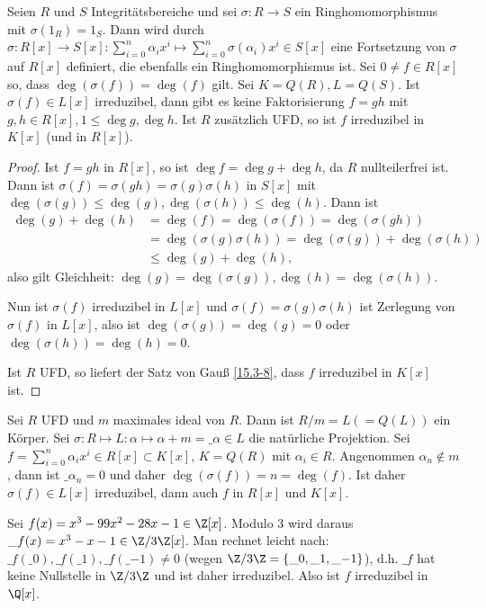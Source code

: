 \begin{st}[Reduktionskriterium] \label{15.3-12}
	Seien $R$ und $S$ Integritätsbereiche und sei $\sigma: R \to S$ ein Ringhomomorphismus mit $\sigma(1_R) = 1_S$.
	Dann wird durch $\sigma: R[x] \to S[x] : \sum_{i=0}^n \alpha_i x^i \mapsto \sum_{i=0}^n \sigma(\alpha_i) x^i \in S[x]$ eine Fortsetzung von $\sigma$ auf $R[x]$ definiert, die ebenfalls ein Ringhomomorphismus ist.
	Sei $0 \neq f \in R[x]$ so, dass $\deg(\sigma(f)) = \deg(f)$ gilt.
	Sei $K = Q(R), L = Q(S)$.
	Ist $\sigma(f) \in L[x]$ irreduzibel, dann gibt es keine Faktorisierung $f = gh$ mit $g, h \in R[x], 1 \le \deg g, \deg h$.
	Ist $R$ zusätzlich UFD, so ist $f$ irreduzibel in $K[x]$ (und in $R[x]$).
	\begin{proof}
		Ist $f = gh$ in $R[x]$, so ist $\deg f = \deg g + \deg h$, da $R$ nullteilerfrei ist.
		Dann ist $\sigma(f) = \sigma(gh) = \sigma(g)\sigma(h)$ in $S[x]$ mit $\deg(\sigma(g)) \le \deg(g), \deg(\sigma(h)) \le \deg(h)$.
		Dann ist
		\begin{align*}
			\deg(g) + \deg(h)
			&= \deg(f)
			= \deg(\sigma(f))
			= \deg(\sigma(gh)) \\
			&= \deg(\sigma(g)\sigma(h))
			= \deg(\sigma(g)) + \deg(\sigma(h)) \\
			&\le \deg(g) + \deg(h),
		\end{align*}
		also gilt Gleichheit: $\deg(g) = \deg(\sigma(g)), \deg(h) = \deg(\sigma(h))$.

		Nun ist $\sigma(f)$ irreduzibel in $L[x]$ und $\sigma(f) = \sigma(g)\sigma(h)$ ist Zerlegung von $\sigma(f)$ in $L[x]$, also ist $\deg(\sigma(g)) = \deg(g) = 0$ oder $\deg(\sigma(h)) = \deg(h) = 0$.

		Ist $R$ UFD, so liefert der Satz von Gauß \ref{15.3-8}, dass $f$ irreduzibel in $K[x]$ ist.
	\end{proof}
\end{st}

\begin{ex} \label{15.3-13}
	Sei $R$ UFD und $m$ maximales ideal von $R$.
	Dann ist $R / m = L (= Q(L))$ ein Körper.
	Sei $\sigma: R \mapsto L: \alpha \mapsto \alpha + m = \_\alpha \in L$ die natürliche Projektion.
	Sei $f = \sum_{i=0}^n \alpha_i x^i \in R[x] \subset K[x]$, $K = Q(R)$ mit $\alpha_i \in R$.
	Angenommen $\alpha_n \not\in m$, dann ist $\_{\alpha_n} = 0$ und daher $\deg(\sigma(f)) = n = \deg(f)$.
	Ist daher $\sigma(f) \in L[x]$ irreduzibel, dann auch $f$ in $R[x]$ und $K[x]$.
	\begin{ex*}
		Sei $f(x) = x^3 - 99x^2 - 28x - 1 \in \Z[x]$.
		Modulo 3 wird daraus $\_f(x) = x^3 - x - 1 \in \Z / 3\Z[x]$.
		Man rechnet leicht nach: $\_f(\_0), \_f(\_1), \_f(\_{-1}) \neq 0$ (wegen $\Z / 3\Z = \{\_0, \_1, \_{-1}\}$), d.h. $\_f$ hat keine Nullstelle in $\Z / 3\Z$ und ist daher irreduzibel.
		Also ist $f$ irreduzibel in $\Q[x]$.
	\end{ex*}
\end{ex}

